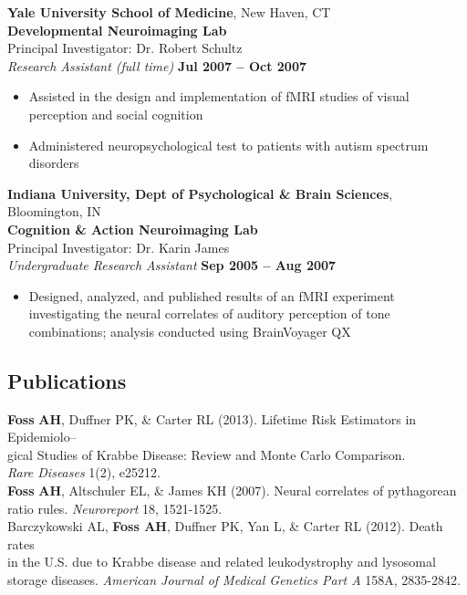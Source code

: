 \documentclass[margin]{res}
\begin{document}
\begin{resume}
 {\bf Yale University School of Medicine}, New Haven, CT\\
 {\bf Developmental Neuroimaging Lab}\\
 Principal Investigator: Dr. Robert Schultz\\
 {\it Research Assistant (full time)} \hfill {\bf Jul 2007 -- Oct 2007}
 \begin{itemize} \itemsep -2pt
  \item Assisted in the design and implementation of fMRI studies of
        visual perception and social cognition
  \item Administered neuropsychological test to patients with autism spectrum
        disorders
 \end{itemize}

 {\bf Indiana University, Dept of Psychological \& Brain Sciences}, Bloomington, IN\\
 {\bf Cognition \& Action Neuroimaging Lab}\\
 Principal Investigator: Dr. Karin James\\
 {\it Undergraduate Research Assistant} \hfill {\bf Sep 2005 -- Aug 2007}
 \begin{itemize} \itemsep -2pt
  \item Designed, analyzed, and published results of an fMRI experiment 
        investigating the neural correlates of auditory perception of tone 
        combinations; analysis conducted using BrainVoyager QX
 \end{itemize}
 

\begin{tabbing}
\section{Publications}
 {\bf Foss} \= {\bf AH}, Duffner PK, \& Carter RL (2013). Lifetime Risk Estimators in Epidemiolo-- \\
 \> gical Studies of Krabbe Disease: Review and Monte Carlo Comparison. \\
 \> {\it Rare Diseases} 1(2), e25212. \\

 {\bf Foss} {\bf AH}, Altschuler EL, \& James KH (2007). 
 Neural correlates of pythagorean\\ 
 \> ratio rules. {\it Neuroreport} 18, 1521-1525.\\

 Barczykowski AL, {\bf Foss AH}, Duffner PK, Yan L, \& Carter 
 RL (2012). Death rates \\
 \> in the U.S. due to Krabbe disease and related leukodystrophy and 
 lysosomal \\
 \> storage diseases. {\it American Journal of Medical Genetics Part A} 158A, 2835-2842.\\


\end{tabbing}
\end{resume}
\end{document}
